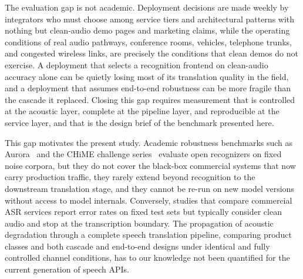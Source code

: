 The evaluation gap is not academic. Deployment decisions are made
weekly by integrators who must choose among service tiers and architectural
patterns with nothing but clean-audio demo pages and marketing claims, while
the operating conditions of real audio pathways, conference rooms, vehicles,
telephone trunks, and congested wireless links, are precisely the conditions
that clean demos do not exercise. A deployment that selects a recognition
frontend on clean-audio accuracy alone can be quietly losing most of its
translation quality in the field, and a deployment that assumes end-to-end
robustness can be more fragile than the cascade it replaced. Closing this
gap requires measurement that is controlled at the acoustic layer, complete
at the pipeline layer, and reproducible at the service layer, and that is
the design brief of the benchmark presented here.

This gap motivates the present study. Academic robustness benchmarks such as
Aurora~\citep{pearce2000aurora} and the CHiME challenge
series~\citep{barker2018fifth} evaluate open recognizers on fixed noise
corpora, but they do not cover the black-box commercial systems that now carry
production traffic, they rarely extend beyond recognition to the downstream
translation stage, and they cannot be re-run on new model versions without
access to model internals. Conversely, studies that compare commercial ASR
services report error rates on fixed test sets but typically consider clean
audio and stop at the transcription boundary. The propagation of acoustic
degradation through a complete speech translation pipeline, comparing
product classes and both cascade and end-to-end designs under
identical and fully controlled channel conditions, has to our knowledge not
been quantified for the current generation of speech APIs.

